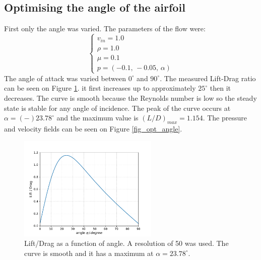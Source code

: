 \documentclass[12pt, a4paper]{article}
\begin{document}
\subsection{Optimising the angle of the airfoil}
First only the angle was varied. The parameters of the flow were:
\begin{equation}
\begin{cases}
v_{in} = 1.0 \\
\rho = 1.0 \\
\mu = 0.1 \\
p = (-0.1,\, -0.05,\, \alpha)
\end{cases}
\end{equation}
The angle of attack was varied between $0^\circ$ and $90^\circ$. The measured Lift-Drag ratio can be seen on Figure \ref{fig_lift_drag}. it first increases up to approximately $25^\circ$ then it decreases. The curve is smooth because the Reynolds number is low so the steady state is stable for any angle of incidence. The peak of the curve occurs at $\alpha = (-) 23.78^\circ$ and the maximum value is $(L/D)_{max} = 1.154$. The pressure and velocity fields can be seen on Figure \ref{fig_opt_angle}.
\begin{figure}[htbp]
    \centering
    \includegraphics[height=5cm]{lift_drag.pdf}
    \caption{Lift/Drag as a function of angle. A resolution of 50 was used. The curve is smooth and it has a maximum at $\alpha = 23.78^\circ$.}
    \label{fig_lift_drag}
\end{figure}
\end{document}
